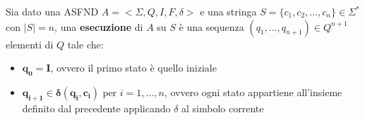 \colorbox{SALZO}{\parbox{\dimexpr\linewidth-2\fboxsep}{\begin{definition}
   Sia dato una ASFND $A = <\Sigma, Q, I,F,\delta>$ e una stringa $S = \{ c_1,c_2,\dots,c_n  \} \in \Sigma^*$ con $|S| = n$, una \textbf{esecuzione} di $A$ su $S$ è una sequenza
   $(q_1,\dots,q_{n+1}) \in Q^{n+1}$ elementi di $Q$ tale che:
   \begin{itemize}
    \item $\bm{q_0 = I}$, ovvero il primo stato è quello iniziale
    \item $\bm{q_{i+1}\in \delta(q_i,c_i) } \text{ per } i = 1,\dots, n$, ovvero ogni stato appartiene all'insieme definito dal precedente applicando $\delta$ al simbolo corrente

   \end{itemize}

\end{definition}}}\smallskip\\




